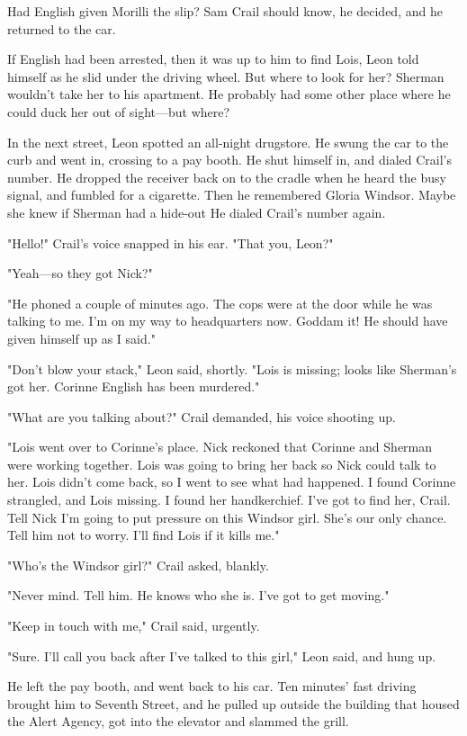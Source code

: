 \documentclass{novel}
\begin{document}
Had English given Morilli the slip? Sam Crail should know, he decided, and he returned to the car.

If English had been arrested, then it was up to him to find Lois, Leon told himself as he slid under the driving wheel. But where to look for her? Sherman wouldn't take her to his apartment. He probably had some other place where he could duck her out of sight—but where?

In the next street, Leon spotted an all-night drugstore. He swung the car to the curb and went in, crossing to a pay booth. He shut himself in, and dialed Crail's number. He dropped the receiver back on to the cradle when he heard the busy signal, and fumbled for a cigarette. Then he remembered Gloria Windsor. Maybe she knew if Sherman had a hide-out He dialed Crail's number again.

"Hello!" Crail's voice snapped in his ear. "That you, Leon?"

"Yeah—so they got Nick?"

"He phoned a couple of minutes ago. The cops were at the door while he was talking to me. I'm on my way to headquarters now. Goddam it! He should have given himself up as I said."

"Don't blow your stack," Leon said, shortly. "Lois is missing; looks like Sherman's got her. Corinne English has been murdered."

"What are you talking about?" Crail demanded, his voice shooting up.

"Lois went over to Corinne's place. Nick reckoned that Corinne and Sherman were working together. Lois was going to bring her back so Nick could talk to her. Lois didn't come back, so I went to see what had happened. I found Corinne strangled, and Lois missing. I found her handkerchief. I've got to find her, Crail. Tell Nick I'm going to put pressure on this Windsor girl. She's our only chance. Tell him not to worry. I'll find Lois if it kills me."

"Who's the Windsor girl?" Crail asked, blankly.

"Never mind. Tell him. He knows who she is. I've got to get moving."

"Keep in touch with me," Crail said, urgently.

"Sure. I'll call you back after I've talked to this girl," Leon said, and hung up.

He left the pay booth, and went back to his car. Ten minutes' fast driving brought him to Seventh Street, and he pulled up outside the building that housed the Alert Agency, got into the elevator and slammed the grill.
\end{document}
